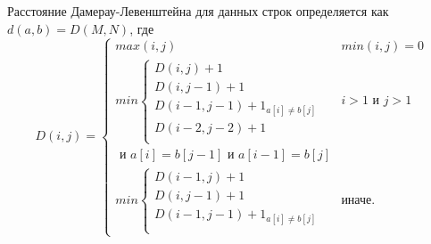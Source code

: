Расстояние Дамерау-Левенштейна для данных строк определяется как $d(a, b) = D(M, N)$, где
\begin{equation*}
    D(i, j) =
    \begin{cases}
        max(i, j) & min(i, j)=0\\
        min
        \begin{cases}
            D(i, j)+1\\
            D(i, j-1)+1\\
            D(i-1, j-1)+1_{a[i] \ne b[j]}\\
            D(i-2, j-2)+1\\
        \end{cases} & i>1 \text{ и } j>1 \\ \text{ и } a[i]=b[j-1] \text{ и } a[i-1]=b[j]\\
        min
        \begin{cases}
            D(i-1, j)+1\\
            D(i, j-1)+1\\
            D(i-1, j-1)+1_{a[i] \ne b[j]}\\
        \end{cases} & \text{иначе.}
    \end{cases}
\end{equation*}
